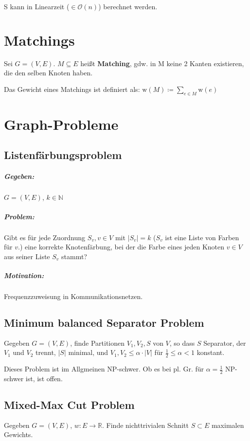 \documentclass[a4paper,11pt]{report}
\begin{document}
S kann in Linearzeit ($\in \mathcal{O}(n)$) berechnet werden.


\chapter{Matchings}
Sei $G = (V, E)$. $M \subseteq E$ heißt {\bf Matching}, gdw. in M keine 2 Kanten existieren, die den selben Knoten haben.

Das Gewicht eines Matchings ist definiert als: $\text{w}(M) \coloneqq \sum_{e \in M} \text{w}(e)$


\chapter{Graph-Probleme}
\section{Listenfärbungsproblem}
\paragraph{Gegeben:} $G = (V, E)$, $k \in \mathbb{N}$

\paragraph{Problem:} Gibt es für jede Zuordnung $S_v, v \in V$ mit $|S_v| = k$ ($S_v$ ist eine Liste von Farben für $v$.) eine korrekte Knotenfärbung, bei der die Farbe eines jeden Knoten $v \in V$ aus seiner Liste $S_v$ stammt?

\paragraph{Motivation:} Frequenzzuweisung in Kommunikationsnetzen.


\section{Minimum balanced Separator Problem}
Gegeben $G = (V, E)$, finde Partitionen $V_1, V_2, S$ von $V$, so dass $S$ Separator, der $V_1$ und $V_2$ trennt, $|S|$ minimal, und $V_1, V_2 \leq \alpha \cdot |V|$ für $\frac{1}{2} \leq \alpha < 1$ konstant.

Dieses Problem ist im Allgmeinen NP-schwer. Ob es bei pl. Gr. für $\alpha = \frac{1}{2}$ NP-schwer ist, ist offen.


\section{Mixed-Max Cut Problem}
Gegeben $G = (V, E)$, $w : E \rightarrow \mathbb{R}$. Finde nichttrivialen Schnitt $S \subset E$ maximalen Gewichts.
\end{document}
